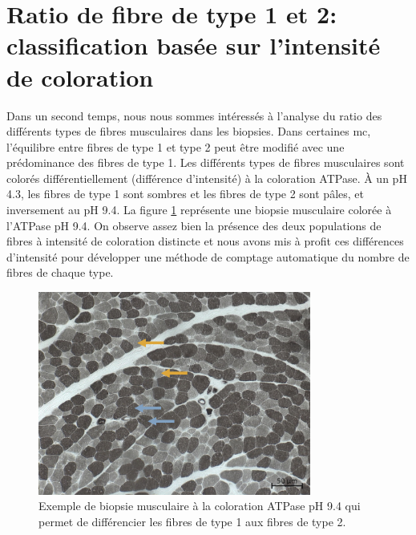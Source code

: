 \section{Ratio de fibre de type 1 et 2: classification basée sur l'intensité de coloration}

Dans un second temps, nous nous sommes intéressés à l'analyse du ratio des différents types de fibres musculaires dans les biopsies. Dans certaines \gls{mc}, l'équilibre entre fibres de type 1 et type 2 peut être modifié avec une prédominance des fibres de type 1. Les différents types de fibres musculaires sont colorés différentiellement (différence d'intensité) à la coloration ATPase. À un pH 4.3, les fibres de type 1 sont sombres et les fibres de type 2 sont pâles, et inversement au pH 9.4. La figure \ref{fig:atp_example} représente une biopsie musculaire colorée à l'ATPase pH 9.4. On observe assez bien la présence des deux populations de fibres à intensité de coloration distincte et nous avons mis à profit ces différences d'intensité pour développer une méthode de comptage automatique du nombre de fibres de chaque type.
\begin{figure}[!ht]
 \centering
 \includegraphics[width=0.8\textwidth]{figures/atp_example.png}
 \caption[Exemple de biopsie musculaire à la coloration ATPase pH 9.4]{Exemple de biopsie musculaire à la coloration ATPase pH 9.4 qui permet de différencier les fibres de type 1 aux fibres de type 2.}
 \label{fig:atp_example}
\end{figure}
